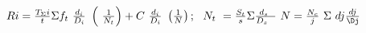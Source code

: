 \(Ri=\frac{T_{\Sigma}i}{t}\Sigma f_t\ \frac{d_i}{D_i}\ \left(\ \frac{1}{N_t}\right)+C\ \frac{d_i}{D_i}\ \left(\frac{1}{N}\right);\ \ N_t\ =\frac{S_t}{s}\Sigma\frac{d_s\ }{D_s\ \ }\ N=\frac{N_c}{j}\ \Sigma\ dj\frac{dj}{\Dj}\)
